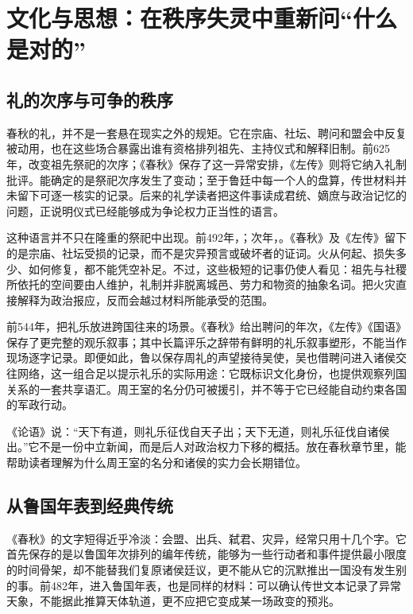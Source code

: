 \section{文化与思想：在秩序失灵中重新问“什么是对的”}

\subsection{礼的次序与可争的秩序}

春秋的礼，并不是一套悬在现实之外的规矩。它在宗庙、社坛、聘问和盟会中反复被动用，也在这些场合暴露出谁有资格排列祖先、主持仪式和解释旧制。前625年，改变祖先祭祀的次序；《春秋》保存了这一异常安排，《左传》则将它纳入礼制批评。能确定的是祭祀次序发生了变动；至于鲁廷中每一个人的盘算，传世材料并未留下可逐一核实的记录。后来的礼学读者把这件事读成君统、嫡庶与政治记忆的问题，正说明仪式已经能够成为争论权力正当性的语言。

这种语言并不只在隆重的祭祀中出现。前492年，；次年，。《春秋》及《左传》留下的是宗庙、社坛受损的记录，而不是灾异预言或破坏者的证词。火从何起、损失多少、如何修复，都不能凭空补足。不过，这些极短的记事仍使人看见：祖先与社稷所依托的空间要由人维护，礼制并非脱离城邑、劳力和物资的抽象名词。把火灾直接解释为政治报应，反而会越过材料所能承受的范围。

前544年，把礼乐放进跨国往来的场景。《春秋》给出聘问的年次，《左传》《国语》保存了更完整的观乐叙事；其中长篇评乐之辞带有鲜明的礼乐叙事塑形，不能当作现场逐字记录。即便如此，鲁以保存周礼的声望接待吴使，吴也借聘问进入诸侯交往网络，这一组合足以提示礼乐的实际用途：它既标识文化身份，也提供观察列国关系的一套共享语汇。周王室的名分仍可被援引，并不等于它已经能自动约束各国的军政行动。

\begin{textwindow}[“礼乐征伐自诸侯出”】【论语】]
《论语》说：“天下有道，则礼乐征伐自天子出；天下无道，则礼乐征伐自诸侯出。”它不是一份中立新闻，而是后人对政治权力下移的概括。放在春秋章节里，能帮助读者理解为什么周王室的名分和诸侯的实力会长期错位。
\end{textwindow}

\subsection{从鲁国年表到经典传统}

《春秋》的文字短得近乎冷淡：会盟、出兵、弑君、灾异，经常只用十几个字。它首先保存的是以鲁国年次排列的编年传统，能够为一些行动者和事件提供最小限度的时间骨架，却不能替我们复原诸侯廷议，更不能从它的沉默推出一国没有发生别的事。前482年，进入鲁国年表，也是同样的材料：可以确认传世文本记录了异常天象，不能据此推算天体轨道，更不应把它变成某一场政变的预兆。

